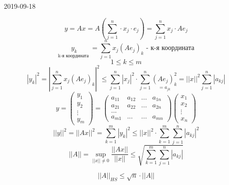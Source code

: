 \documentclass[main]{subfiles}
\begin{document}
\begin{lect}{2019-09-18}
	\begin{Proof}
		\[y = Ax = A(\sum_{j = 1}^n \cdot x_j \cdot e_j) = \sum^n_{j = 1} x_j \cdot Ae_j \]
		\[\underset{\text{k-я координата }}{y_k} = \sum^n_{j = 1}x_j(Ae_j)_k \text{ - к-я координата} \]
		\[1 \leq k \leq m\]
		\[|y_k|^2 = |\sum^n_{j = 1} x_j (Ae_j)_k|^2 \leq \sum_{j = 1}^n |x_j|^2 \cdot
			\sum^n_{j=1} \underset{= a_{jk} }{(Ae_j)_k^2} = ||x||^2 \sum^n_{j = 1} |a_{kj}| \]
		\[y = \begin{pmatrix}
				y_1    \\
				y_2    \\
				\vdots \\
				y_m
			\end{pmatrix}
			= \begin{pmatrix}
				a_{11} & a_{12} & ... & a_{1n} \\
				a_{21} & a_{22} & ... & a_{2n} \\
				...                            \\
				a_{m1} & ...    & ... & a_{mn}
			\end{pmatrix}
			\begin{pmatrix}
				x_1    \\
				x_2    \\
				\vdots \\
				x_n
			\end{pmatrix}
		\]
		\[||y||^2 = ||Ax||^2 = \sum^m_{k = 1}|y_k|^2 \leq ||x||^2 \cdot \sum^m_{k = 1}\sum^n_{j = 1} |a_{kj}|^2\]
		\[||A|| = \sup_{||x|| \neq 0} \frac{||Ax||}{||x||} \leq \sqrt{\sum^m_{k = 1} \sum^n_{j = 1} |a_{kj}| }\]
	\end{Proof}

	\begin{Upr}
		\[||A||_{HS} \leq \sqrt{n} \cdot ||A||\]
	\end{Upr}


\end{lect}
\end{document}
